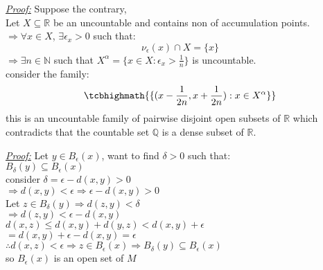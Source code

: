 \documentclass{article}
\begin{document}
\begin{tcolorbox}[enhanced,attach boxed title to top center={yshift=-3mm,yshifttext=-1mm},
  colback=blue!5!white,colframe=blue!75!black,colbacktitle=red!80!black,
  title=Exercise 38.5(c):,fonttitle=\bfseries,
  boxed title style={size=small,colframe=red!50!black} ]
 \textit{\color{blue}\underline{Proof:}} Suppose the contrary,\\
 Let $X\subseteq\mathbb{R}$ be an uncountable and contains non of accumulation points.\\
 $\Rightarrow\forall x\in X$, $\exists \epsilon_x>0$ such that:
 $$\nu_\epsilon (x)\cap X=\{x\}$$
 $\Rightarrow\exists n\in \mathbb{N}$ such that $X^\alpha=\{x\in X: \epsilon_x>\frac{1}{n}\}$ is uncountable.\\
 consider the family:
 $$\tcbhighmath{\{(x-\frac{1}{2n},x+\frac{1}{2n}):x\in X^\alpha\}}$$
 this is an uncountable family of pairwise disjoint open subsets of $\mathbb{R}$ which contradicts that the countable set $\mathbb{Q}$ is a dense subset of $\mathbb{R}$.

\end{tcolorbox}


\begin{tcolorbox}[enhanced,attach boxed title to top center={yshift=-3mm,yshifttext=-1mm},
  colback=blue!5!white,colframe=blue!75!black,colbacktitle=red!80!black,
  title=Prove that $B_\epsilon (x)$is open set:,fonttitle=\bfseries,
  boxed title style={size=small,colframe=red!50!black} ]
     \textit{\color{blue}\underline{Proof:}}
     Let $y\in B_\epsilon (x)$, want to find $\delta >0$ such that:\\
     $B_\delta (y)\subseteq B_\epsilon (x)$\\
     consider $\delta=\epsilon-d(x,y)>0$\\
     $\Rightarrow d(x,y)<\epsilon\Rightarrow \epsilon-d(x,y)>0$\\
     Let $z\in B_\delta (y)\Rightarrow d(z,y)<\delta$\\
     $\Rightarrow d(z,y)<\epsilon-d(x,y)$\\
     $d(x,z)\leq d(x,y)+d(y,z)<d(x,y)+\epsilon$\\
     $=d(x,y)+\epsilon-d(x,y)=\epsilon$\\
     $\therefore d(x,z)<\epsilon\Rightarrow z\in B_\epsilon (x)\Rightarrow B_\delta (y) \subseteq B_\epsilon (x)$\\
     so $B_\epsilon (x)$ is an open set of $M$

\end{tcolorbox}
\end{document}
